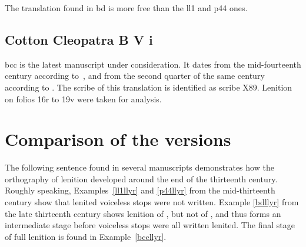 The translation found in \gls{bd} is more free than the \gls{ll1} and \gls{p44} ones.


\subsection{Cotton Cleopatra B V i}
\label{sec:cotton-cleopatra-b}
\Gls{bcc} is the latest manuscript under consideration.
It dates from the mid-fourteenth century according to~\textcite[xlv]{roberts_astudiaeth_1969}, and from the second quarter of the same century according to \textcite[xviii]{jones_brenhinedd_1971}.
The scribe of this  translation is identified as scribe X89.
Lenition on folios 16r to 19v were taken for analysis.

\section{Comparison of the versions}
\label{sec:comparison-versions}
The following sentence found in several manuscripts demonstrates how the orthography of lenition developed around the end of the thirteenth century.
Roughly speaking, Examples~\ref{ll1llyr} and \ref{p44llyr} from the mid-thirteenth century show that lenited voiceless stops were not written.
Example \ref{bdllyr} from the late thirteenth century shows lenition of , but not of , and thus forms an intermediate stage before voiceless stops were all written lenited.
The final stage of full lenition is found in Example~\ref{bccllyr}.

